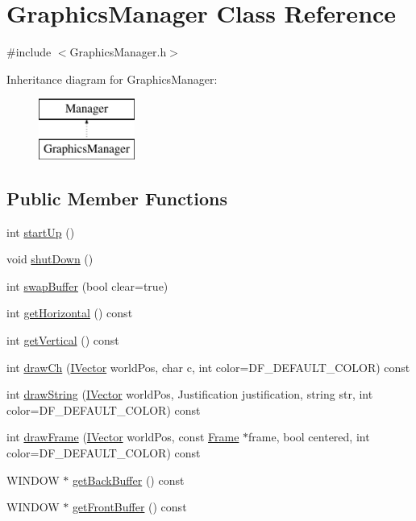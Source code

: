 \hypertarget{class_graphics_manager}{\section{Graphics\+Manager Class Reference}
\label{class_graphics_manager}
}


{\ttfamily \#include $<$Graphics\+Manager.\+h$>$}

Inheritance diagram for Graphics\+Manager\+:\begin{figure}[H]
\begin{center}
\leavevmode
\includegraphics[height=2.000000cm]{class_graphics_manager}
\end{center}
\end{figure}
\subsection*{Public Member Functions}
\begin{DoxyCompactItemize}
\item 
int \hyperlink{class_graphics_manager_ac1961e1b4985a41a6eb233736d5d3191}{start\+Up} ()
\item 
void \hyperlink{class_graphics_manager_a5d850ef5d3a6792eb270fa22b784b3e6}{shut\+Down} ()
\item 
int \hyperlink{class_graphics_manager_a18954a6304591268760d2eab5804d7b3}{swap\+Buffer} (bool clear=true)
\item 
int \hyperlink{class_graphics_manager_a4d727210ad9f36755f961f1ef95a9edb}{get\+Horizontal} () const 
\item 
int \hyperlink{class_graphics_manager_a8285df9ae37927930fac787293041517}{get\+Vertical} () const 
\item 
int \hyperlink{class_graphics_manager_a99cd53145eebabc3cb707bb8717a8529}{draw\+Ch} (\hyperlink{class_i_vector}{I\+Vector} world\+Pos, char c, int color=D\+F\+\_\+\+D\+E\+F\+A\+U\+L\+T\+\_\+\+C\+O\+L\+O\+R) const 
\item 
int \hyperlink{class_graphics_manager_ab7925ff75e907e644199ed042f4d35e1}{draw\+String} (\hyperlink{class_i_vector}{I\+Vector} world\+Pos, Justification justification, string str, int color=D\+F\+\_\+\+D\+E\+F\+A\+U\+L\+T\+\_\+\+C\+O\+L\+O\+R) const 
\item 
int \hyperlink{class_graphics_manager_a46fdb7da074537ca39b8b0e91ec9f95a}{draw\+Frame} (\hyperlink{class_i_vector}{I\+Vector} world\+Pos, const \hyperlink{class_frame}{Frame} $\ast$frame, bool centered, int color=D\+F\+\_\+\+D\+E\+F\+A\+U\+L\+T\+\_\+\+C\+O\+L\+O\+R) const 
\item 
W\+I\+N\+D\+O\+W $\ast$ \hyperlink{class_graphics_manager_a5387f69913132a6e572fa1018961640f}{get\+Back\+Buffer} () const 
\item 
W\+I\+N\+D\+O\+W $\ast$ \hyperlink{class_graphics_manager_a0c6b0d00061ca962eeefbe813879ceb4}{get\+Front\+Buffer} () const 
\end{DoxyCompactItemize}
